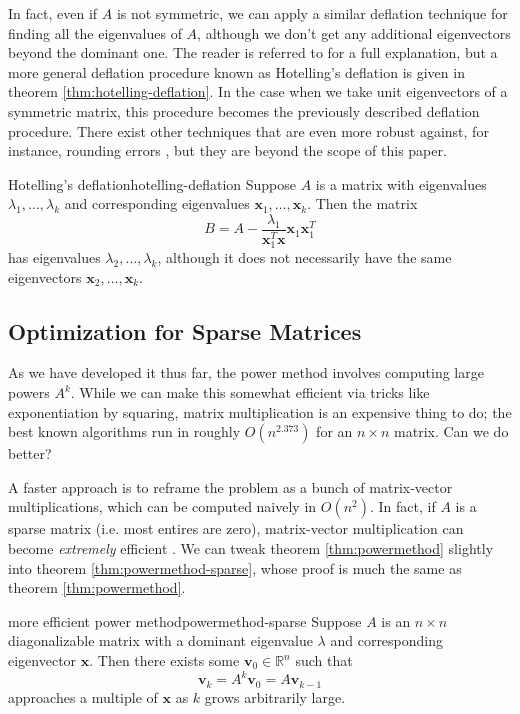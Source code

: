 \documentclass{article}
\let\vec\mathbf
\begin{document}
In fact, even if $A$ is not symmetric, we can apply a similar deflation technique for finding all the eigenvalues of $A$, although we don't get any additional eigenvectors beyond the dominant one. The reader is referred to \cite{deflation} for a full explanation, but a more general deflation procedure known as Hotelling's deflation is given in theorem \ref{thm:hotelling-deflation}. In the case when we take unit eigenvectors of a symmetric matrix, this procedure becomes the previously described deflation procedure. There exist other techniques that are even more robust against, for instance, rounding errors \cite{deflation-robots}, but they are beyond the scope of this paper.

\begin{theorem}{Hotelling's deflation}{hotelling-deflation}
  Suppose $A$ is a matrix with eigenvalues $\lambda_1, \ldots, \lambda_k$ and corresponding eigenvalues $\vec{x}_1, \ldots, \vec{x}_k$. Then the matrix
  \begin{equation*}
    B = A - \frac{\lambda_1}{\vec{x}_1^T\vec{x}}\vec{x}_1\vec{x}_1^T
  \end{equation*}
  has eigenvalues $\lambda_2, \ldots, \lambda_k$, although it does not necessarily have the same eigenvectors $\vec{x}_2, \ldots, \vec{x}_k$.
\end{theorem}

\subsection{Optimization for Sparse Matrices}
As we have developed it thus far, the power method involves computing large powers $A^k$. While we can make this somewhat efficient via tricks like exponentiation by squaring, matrix multiplication is an expensive thing to do; the best known algorithms run in roughly $O(n^{2.373})$ \cite{matmul} for an $n \times n$ matrix. Can we do better?

A faster approach is to reframe the problem as a bunch of matrix-vector multiplications, which can be computed naively in $O(n^2)$. In fact, if $A$ is a sparse matrix (i.e. most entires are zero), matrix-vector multiplication can become \emph{extremely} efficient \cite{pwr-rot}. We can tweak theorem \ref{thm:powermethod} slightly into theorem \ref{thm:powermethod-sparse}, whose proof is much the same as theorem \ref{thm:powermethod}.

\begin{theorem}{more efficient power method}{powermethod-sparse}
  Suppose $A$ is an $n \times n$ diagonalizable matrix with a dominant eigenvalue $\lambda$ and corresponding eigenvector $\vec{x}$. Then there exists some $\vec{v}_0 \in \mathbb{R}^n$ such that
  \begin{equation*}
    \vec{v}_k = A^k\vec{v}_0 = A\vec{v}_{k-1}
  \end{equation*}
  approaches a multiple of $\vec{x}$ as $k$ grows arbitrarily large.
\end{theorem}
\end{document}
